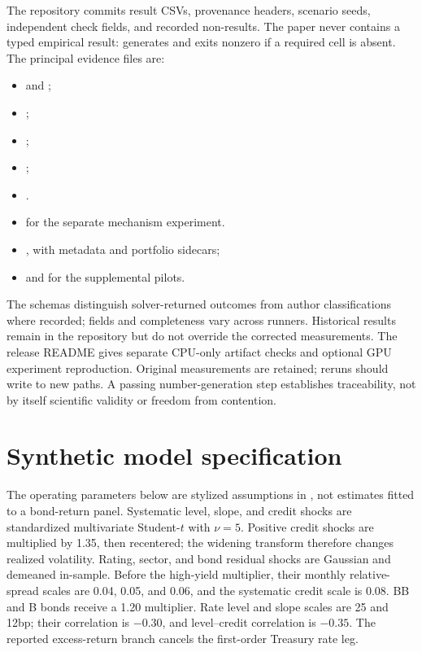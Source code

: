 \documentclass[11pt,a4paper]{article}
\begin{document}
The repository commits result CSVs, provenance headers, scenario seeds,
independent check fields, and recorded non-results. The paper never contains a
typed empirical result:  generates
 and exits nonzero if a required cell is absent.
The principal evidence files are:
\begin{itemize}
\item {} and ;
\item {};
\item {};
\item {};
\item {}.
\item {} for the separate mechanism experiment.
\item {}, with metadata and portfolio sidecars;
\item {} and
       for the supplemental pilots.
\end{itemize}
The schemas distinguish solver-returned outcomes from author classifications
where recorded; fields and completeness vary across runners. Historical
results remain in the repository but do not override the corrected
measurements. The release README gives separate CPU-only artifact checks
and optional GPU experiment reproduction. Original measurements are retained;
reruns should write to new paths. A passing number-generation step establishes
traceability, not by itself scientific validity or freedom from contention.

\appendix
\section{Synthetic model specification}\label{app:generator}

The operating parameters below are stylized assumptions in
, not estimates fitted to a bond-return panel.
Systematic level, slope, and credit shocks are standardized multivariate
Student-$t$ with $\nu=5$. Positive credit shocks are multiplied by 1.35, then
recentered; the widening transform therefore changes realized volatility.
Rating, sector, and bond residual shocks are Gaussian and demeaned in-sample.
Before the high-yield multiplier, their monthly relative-spread scales are
0.04, 0.05, and 0.06, and the systematic credit scale is 0.08. BB and B bonds
receive a 1.20 multiplier. Rate level and slope scales are 25 and 12bp;
their correlation is $-0.30$, and level--credit correlation is $-0.35$.
The reported excess-return branch cancels the first-order Treasury rate leg.
\end{document}
